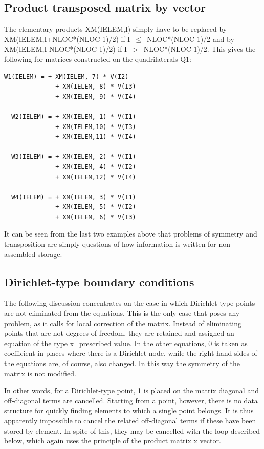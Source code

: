 \subsection{Product transposed matrix by vector}

The elementary products XM(IELEM,I) simply have to be replaced by
XM(IELEM,I+NLOC*(NLOC-1)/2) if I~$\mathrm{\le}$~NLOC*(NLOC-1)/2 and by
XM(IELEM,I-NLOC*(NLOC-1)/2) if I~$>$~NLOC*(NLOC-1)/2. This gives the following
for matrices constructed on the quadrilaterals Q1:

\begin{lstlisting}[language=TelFortran]
  W1(IELEM) = + XM(IELEM, 7) * V(I2)
              + XM(IELEM, 8) * V(I3)
              + XM(IELEM, 9) * V(I4)

  W2(IELEM) = + XM(IELEM, 1) * V(I1)
              + XM(IELEM,10) * V(I3)
              + XM(IELEM,11) * V(I4)

  W3(IELEM) = + XM(IELEM, 2) * V(I1)
              + XM(IELEM, 4) * V(I2)
              + XM(IELEM,12) * V(I4)

  W4(IELEM) = + XM(IELEM, 3) * V(I1)
              + XM(IELEM, 5) * V(I2)
              + XM(IELEM, 6) * V(I3)
\end{lstlisting}

It can be seen from the last two examples above that problems of symmetry and
transposition are simply questions of how information is written for
non-assembled storage.

\subsection{Dirichlet-type boundary conditions}
\label{ref:dirichletbnd}

The following discussion concentrates on the case in which Dirichlet-type
points are not eliminated from the equations. This is the only case that poses
any problem, as it calls for local correction of the matrix. Instead of
eliminating points that are not degrees of freedom, they are retained and
assigned an equation of the type x=prescribed value. In the other equations, 0
is taken as coefficient in places where there is a Dirichlet node, while the
right-hand sides of the equations are, of course, also changed. In this way the
symmetry of the matrix is not modified.

In other words, for a Dirichlet-type point, 1 is placed on the matrix diagonal
and off-diagonal terms are cancelled. Starting from a point, however, there is
no data structure for quickly finding elements to which a single point belongs.
It is thus apparently impossible to cancel the related off-diagonal terms if
these have been stored by element. In spite of this, they may be cancelled with
the loop described below, which again uses the principle of the product matrix
x vector.

